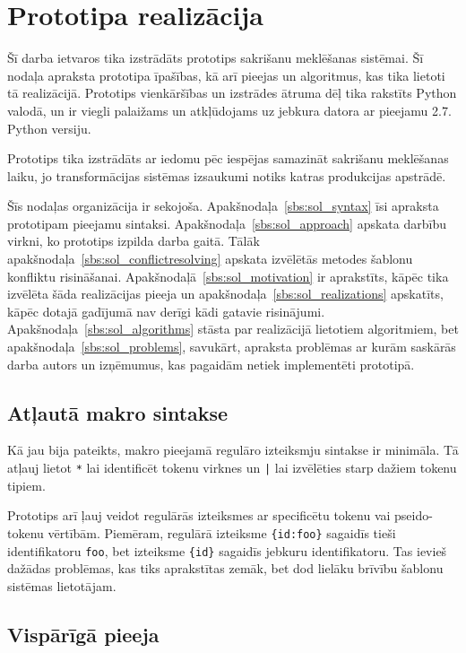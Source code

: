 \section{Prototipa realizācija}

Šī darba ietvaros tika izstrādāts prototips sakrišanu meklēšanas sistēmai. Šī nodaļa apraksta prototipa īpašības, kā arī pieejas un algoritmus, kas tika lietoti tā realizācijā. Prototips vienkāršības un izstrādes ātruma dēļ tika rakstīts Python valodā, un ir viegli palaižams un atkļūdojams uz jebkura datora ar pieejamu 2.7. Python versiju.

Prototips tika izstrādāts ar iedomu pēc iespējas samazināt sakrišanu meklēšanas laiku, jo transformācijas sistēmas izsaukumi notiks katras produkcijas apstrādē.

Šīs nodaļas organizācija ir sekojoša. Apakšnodaļa~\ref{sbs:sol_syntax} īsi apraksta prototipam pieejamu sintaksi. Apakšnodaļa~\ref{sbs:sol_approach} apskata darbību virkni, ko prototips izpilda darba gaitā. Tālāk apakšnodaļa~\ref{sbs:sol_conflictresolving} apskata izvēlētās metodes šablonu konfliktu risināšanai. Apakšnodaļā~\ref{sbs:sol_motivation} ir aprakstīts, kāpēc tika izvēlēta šāda realizācijas pieeja un apakšnodaļa~\ref{sbs:sol_realizations} apskatīts, kāpēc dotajā gadījumā nav derīgi kādi gatavie risinājumi. Apakšnodaļa~\ref{sbs:sol_algorithms} stāsta par realizācijā lietotiem algoritmiem, bet apakšnodaļa~\ref{sbs:sol_problems}, savukārt, apraksta problēmas ar kurām saskārās darba autors un izņēmumus, kas pagaidām netiek implementēti prototipā.

\subsection{\label{sbs:sol_syntax}Atļautā makro sintakse}

Kā jau bija pateikts, makro pieejamā regulāro izteiksmju sintakse ir minimāla. Tā atļauj lietot \verb|*| lai identificēt tokenu virknes un \verb/|/ lai izvēlēties starp dažiem tokenu tipiem.

Prototips arī ļauj veidot regulārās izteiksmes ar specificētu tokenu vai pseido-tokenu vērtībām. Piemēram, regulārā izteiksme \verb|{id:foo}| sagaidīs tieši identifikatoru \verb|foo|, bet izteiksme \verb|{id}| sagaidīs jebkuru identifikatoru. Tas ievieš dažādas problēmas, kas tiks aprakstītas zemāk, bet dod lielāku brīvību šablonu sistēmas lietotājam.

\subsection{\label{sbs:sol_approach}Vispārīgā pieeja}

